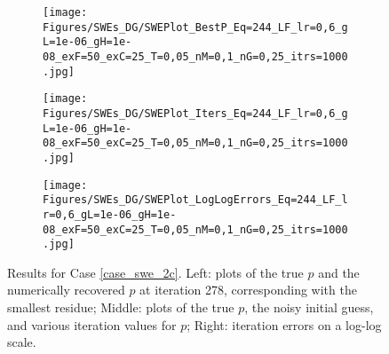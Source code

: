 \begin{figure}[H]
    \begin{subfigure}[t]{0.32\textwidth}
        \centering
        \texttt{[image: Figures/SWEs\_DG/SWEPlot\_BestP\_Eq=244\_LF\_lr=0,6\_gL=1e-06\_gH=1e-08\_exF=50\_exC=25\_T=0,05\_nM=0,1\_nG=0,25\_itrs=1000.jpg]}
    \end{subfigure}
    \begin{subfigure}[t]{0.32\textwidth}
        \centering
        \texttt{[image: Figures/SWEs\_DG/SWEPlot\_Iters\_Eq=244\_LF\_lr=0,6\_gL=1e-06\_gH=1e-08\_exF=50\_exC=25\_T=0,05\_nM=0,1\_nG=0,25\_itrs=1000.jpg]}
    \end{subfigure}
    \begin{subfigure}[t]{0.32\textwidth}
        \texttt{[image: Figures/SWEs\_DG/SWEPlot\_LogLogErrors\_Eq=244\_LF\_lr=0,6\_gL=1e-06\_gH=1e-08\_exF=50\_exC=25\_T=0,05\_nM=0,1\_nG=0,25\_itrs=1000.jpg]}
    \end{subfigure}
    \caption{Results for Case \eqref{case_swe_2c}. Left: plots of the true $p$ and the numerically recovered $p$ at iteration 278, corresponding with the smallest residue; Middle: plots of the true $p$, the noisy initial guess, and various iteration values for $p$;  Right: iteration errors on a log-log scale.}
    \label{fig:swe_2C}
\end{figure}

